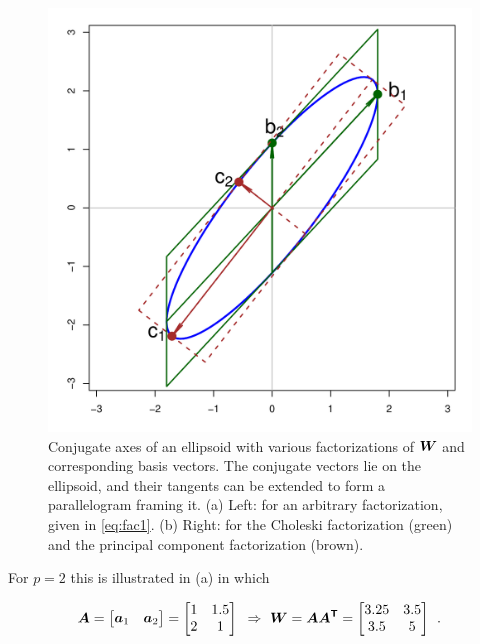 \begin{figure}[htb]
\begin{minipage}[b]{.49\linewidth}
  \includegraphics[width=1\linewidth]{fig/conjugate2}
 \end{minipage}
\caption{Conjugate axes of an ellipsoid with various factorizations of $\bm{W}$ and corresponding
basis vectors. 
The conjugate vectors lie on the ellipsoid, and their tangents can be extended to form a parallelogram framing it.
(a) Left: for an arbitrary factorization, given in \eqref{eq:fac1}.
(b) Right: for the Choleski factorization (green) and the principal component factorization (brown).
}
\label{fig:conjugate}
\end{figure}
For 
$p=2$
this is illustrated in (a) 
in which 

\begin{equation}\label{eq:fac1}
\bm{A}=\left[ \begin{matrix}
   \bm{a}_{1} & \bm{a}_{2}  \\
\end{matrix} \right]=\left[ 
\begin{matrix}
   1 & 1.5  \\
   2 & 1  \\
\end{matrix} \right]
\mbox{   }\Rightarrow\mbox{   }
\bm{W}=\bm{A A^\mathsf{T}}=
\left[ \begin{matrix}
   3.25 & 3.5  \\
   3.5 & 5  \\
\end{matrix} \right]
\:\: . 
\end{equation}

